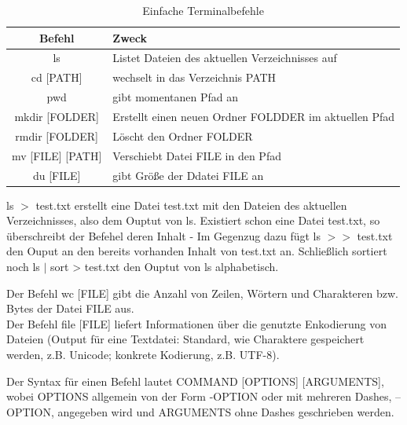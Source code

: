 \documentclass{scrartcl}
\begin{document}
\aufgabe
    \subaufgabe{}
        \begin{table}[H]
            \centering
            \begin{tabular}{c|p{7.5cm}}
                 Befehl & Zweck  \\
                 \hline 
                 ls & Listet Dateien des aktuellen Verzeichnisses auf\\
                 cd [PATH] & wechselt in das Verzeichnis PATH\\
                 pwd & gibt momentanen Pfad an\\
                 mkdir [FOLDER] & Erstellt einen neuen Ordner FOLDDER im aktuellen Pfad\\
                 rmdir [FOLDER] & Löscht den Ordner FOLDER\\
                 mv [FILE] [PATH] & Verschiebt Datei FILE in den Pfad\\
                 du [FILE] & gibt Größe der Ddatei FILE an\\
                 
            \end{tabular}
            \caption{Einfache Terminalbefehle}
            \label{tab:my_label}
        \end{table}

    \subaufgabe{}
        ls $>$ test.txt erstellt eine Datei test.txt mit den Dateien des aktuellen Verzeichnisses, also dem Ouptut von ls. Existiert schon eine Datei test.txt, so überschreibt der Befehel deren Inhalt - Im Gegenzug dazu fügt ls $>>$ test.txt den Ouput an den bereits vorhanden Inhalt von test.txt an. Schließlich sortiert noch ls $\vert$ sort > test.txt den Ouptut von ls alphabetisch.

    \subaufgabe
        Der Befehl wc [FILE] gibt die Anzahl von Zeilen, Wörtern und Charakteren bzw. Bytes der Datei FILE aus.\\

        \noindent Der Befehl file [FILE] liefert Informationen über die genutzte Enkodierung von Dateien (Output für eine Textdatei: Standard, wie Charaktere gespeichert werden, z.B. Unicode; konkrete Kodierung, z.B. UTF-8).

    \subaufgabe
        Der Syntax für einen Befehl lautet COMMAND [OPTIONS] [ARGUMENTS], wobei OPTIONS allgemein von der Form -OPTION oder mit mehreren Dashes, --OPTION, angegeben wird und ARGUMENTS ohne Dashes geschrieben werden.
\end{document}
